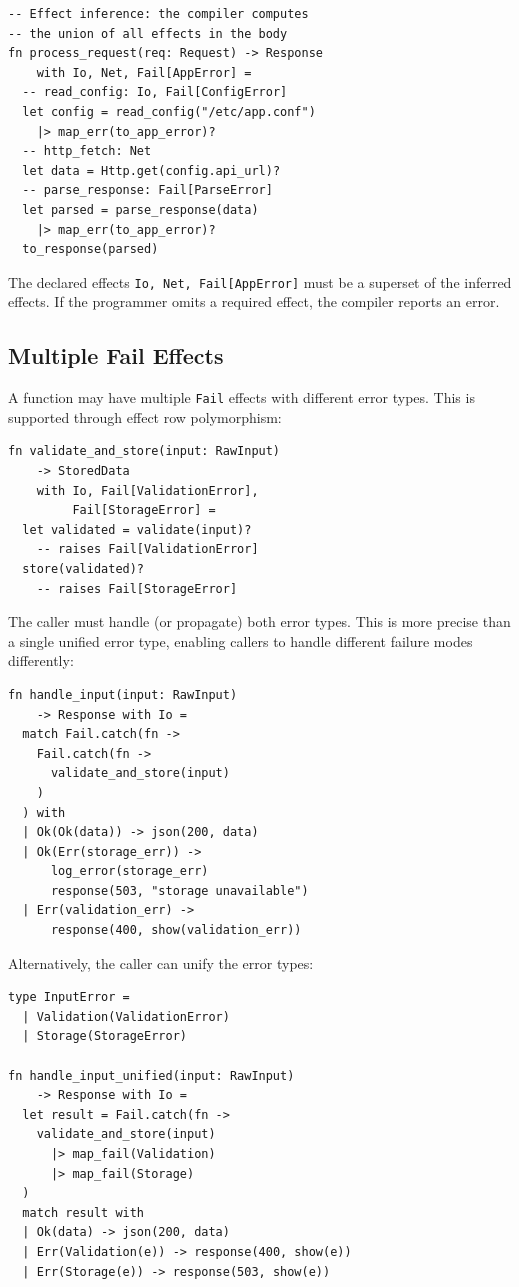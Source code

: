\documentclass[11pt,twocolumn]{article}
\newcommand{\Fail}{\texttt{Fail}}
\begin{document}
\begin{lstlisting}
-- Effect inference: the compiler computes
-- the union of all effects in the body
fn process_request(req: Request) -> Response
    with Io, Net, Fail[AppError] =
  -- read_config: Io, Fail[ConfigError]
  let config = read_config("/etc/app.conf")
    |> map_err(to_app_error)?
  -- http_fetch: Net
  let data = Http.get(config.api_url)?
  -- parse_response: Fail[ParseError]
  let parsed = parse_response(data)
    |> map_err(to_app_error)?
  to_response(parsed)
\end{lstlisting}

The declared effects \texttt{Io, Net, Fail[AppError]} must be a superset of the inferred effects. If the programmer omits a required effect, the compiler reports an error.

\subsection{Multiple Fail Effects}

A function may have multiple \Fail{} effects with different error types. This is supported through effect row polymorphism:

\begin{lstlisting}
fn validate_and_store(input: RawInput)
    -> StoredData
    with Io, Fail[ValidationError],
         Fail[StorageError] =
  let validated = validate(input)?
    -- raises Fail[ValidationError]
  store(validated)?
    -- raises Fail[StorageError]
\end{lstlisting}

The caller must handle (or propagate) both error types. This is more precise than a single unified error type, enabling callers to handle different failure modes differently:

\begin{lstlisting}
fn handle_input(input: RawInput)
    -> Response with Io =
  match Fail.catch(fn ->
    Fail.catch(fn ->
      validate_and_store(input)
    )
  ) with
  | Ok(Ok(data)) -> json(200, data)
  | Ok(Err(storage_err)) ->
      log_error(storage_err)
      response(503, "storage unavailable")
  | Err(validation_err) ->
      response(400, show(validation_err))
\end{lstlisting}

Alternatively, the caller can unify the error types:

\begin{lstlisting}
type InputError =
  | Validation(ValidationError)
  | Storage(StorageError)

fn handle_input_unified(input: RawInput)
    -> Response with Io =
  let result = Fail.catch(fn ->
    validate_and_store(input)
      |> map_fail(Validation)
      |> map_fail(Storage)
  )
  match result with
  | Ok(data) -> json(200, data)
  | Err(Validation(e)) -> response(400, show(e))
  | Err(Storage(e)) -> response(503, show(e))
\end{lstlisting}
\end{document}
